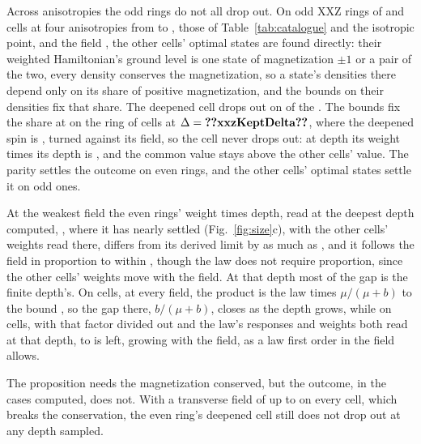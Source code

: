 \documentclass[aps,prd,reprint,superscriptaddress]{revtex4-2}
\begin{document}
Across anisotropies the odd rings do not all drop out. On odd XXZ rings of  and  cells at four anisotropies from  to , those of Table~\ref{tab:catalogue} and the isotropic point, and the field , the other cells' optimal states are found directly: their weighted Hamiltonian's ground level is one state of magnetization $\pm 1$ or a pair of the two, every density conserves the magnetization, so a state's densities there depend only on its share of positive magnetization, and the bounds on their densities fix that share. The deepened cell drops out on  of the . The bounds fix the share at  on the ring of  cells at $\Delta = \val{xxzKeptDelta}$, where the deepened spin is , turned against its field, so the cell never drops out: at depth  its weight times its depth is , and the common value stays  above the other cells' value. The parity settles the outcome on even rings, and the other cells' optimal states settle it on odd ones.

At the weakest field the even rings' weight times depth, read at the deepest depth computed, , where it has nearly settled (Fig.~\ref{fig:size}c), with the other cells' weights read there, differs from its derived limit by as much as , and it follows the field in proportion to within , though the law does not require proportion, since the other cells' weights move with the field. At that depth most of the gap is the finite depth's. On  cells, at every field, the product is the law times $\mu/(\mu + b)$ to the bound , so the gap there, $b/(\mu + b)$, closes as the depth grows, while on  cells, with that factor divided out and the law's responses and weights both read at that depth,  to  is left, growing with the field, as a law first order in the field allows.

The proposition needs the magnetization conserved, but the outcome, in the cases computed, does not. With a transverse field of up to  on every cell, which breaks the conservation, the even ring's deepened cell still does not drop out at any depth sampled.
\end{document}
